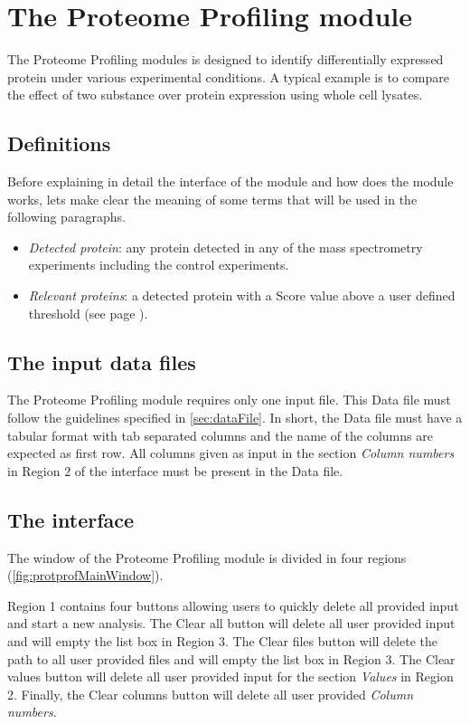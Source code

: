 \chapter{The Proteome Profiling module}
\label{chap:protprof}

The Proteome Profiling modules is designed to identify differentially expressed protein under various experimental conditions. A typical example is to compare the effect of two substance over protein expression using whole cell lysates.

\section{Definitions}

Before explaining in detail the interface of the module and how does the module works, lets make clear the meaning of some terms that will be used in the following paragraphs.

\begin{itemize}
	\item \textit{Detected protein}: any protein detected in any of the mass spectrometry experiments including the control experiments.
	\item \textit{Relevant proteins}: a detected protein with a Score value above a user defined threshold (see page \pageref{par:protprofScoreValue}).
\end{itemize}

\section{The input data files}

The Proteome Profiling module requires only one input file. This Data file must follow the guidelines specified in \autoref{sec:dataFile}. In short, the Data file must have a tabular format with tab separated columns and the name of the columns are expected as first row. All columns given as input in the section \textit{Column numbers} in Region \num{2} of the interface must be present in the Data file.

\section{The interface}

The window of the Proteome Profiling module is divided in four regions (\autoref{fig:protprofMainWindow}). 

Region \num{1} contains four buttons allowing users to quickly delete all provided input and start a new analysis. The Clear all button will delete all user provided input and will empty the list box in Region \num{3}. The Clear files button will delete the path to all user provided files and will empty the list box in Region \num{3}. The Clear values button will delete all user provided input for the section \textit{Values} in Region \num{2}. Finally, the Clear columns button will delete all user provided \textit{Column numbers}. 

